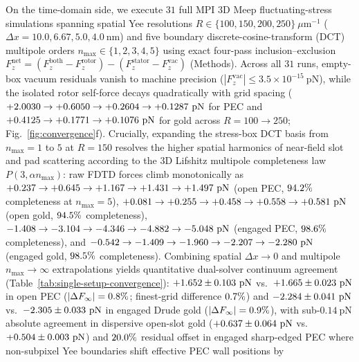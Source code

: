 \documentclass[pdflatex,sn-nature]{sn-jnl}
\begin{document}
On the time-domain side, we execute $31$ full MPI 3D Meep\cite{oskooi2010} fluctuating-stress simulations\cite{rodriguez2009pra} spanning spatial Yee resolutions $R \in \{100, 150, 200, 250\}\ \mu\mathrm{m}^{-1}$ ($\Delta x = 10.0, 6.67, 5.0, 4.0\ \mathrm{nm}$) and five boundary discrete-cosine-transform (DCT) multipole orders $n_{\max} \in \{1,2,3,4,5\}$ using exact four-pass inclusion--exclusion $F_z^{\mathrm{net}} = (F_z^{\mathrm{both}} - F_z^{\mathrm{rotor}}) - (F_z^{\mathrm{stator}} - F_z^{\mathrm{vac}})$ (Methods). Across all $31$ runs, empty-box vacuum residuals vanish to machine precision ($|F_z^{\mathrm{vac}}| \le 3.5 \times 10^{-15}\ \mathrm{pN}$), while the isolated rotor self-force decays quadratically with grid spacing ($+2.0030{} \to +0.6050{} \to +0.2604{} \to +0.1287{}\ \mathrm{pN}$ for PEC and $+0.4125{} \to +0.1771{} \to +0.1076{}\ \mathrm{pN}$ for gold across $R=100\to 250$; Fig.~\ref{fig:convergence}f). Crucially, expanding the stress-box DCT basis from $n_{\max}=1$ to $5$ at $R=150$ resolves the higher spatial harmonics of near-field slot and pad scattering according to the 3D Lifshitz multipole completeness law $P(3,\alpha n_{\max})$: raw FDTD forces climb monotonically as $+0.237{} \to +0.645{} \to +1.167{} \to +1.431{} \to +1.497{}\ \mathrm{pN}$ (open PEC, $94.2{}\%$ completeness at $n_{\max}=5$), $+0.081{} \to +0.255{} \to +0.458{} \to +0.558{} \to +0.581{}\ \mathrm{pN}$ (open gold, $94.5{}\%$ completeness), $-1.408{} \to -3.104{} \to -4.346{} \to -4.882{} \to -5.048{}\ \mathrm{pN}$ (engaged PEC, $98.6{}\%$ completeness), and $-0.542{} \to -1.409{} \to -1.960{} \to -2.207{} \to -2.280{}\ \mathrm{pN}$ (engaged gold, $98.5{}\%$ completeness). Combining spatial $\Delta x \to 0$ and multipole $n_{\max} \to \infty$ extrapolations yields quantitative dual-solver continuum agreement (Table~\ref{tab:single-setup-convergence}): $+1.652{} \pm 0.103{}\ \mathrm{pN}$ vs.\ $+1.665{} \pm 0.023{}\ \mathrm{pN}$ in open PEC ($|\Delta F_\infty| = 0.8{}\%$; finest-grid difference $0.7{}\%$) and $-2.284{} \pm 0.041{}\ \mathrm{pN}$ vs.\ $-2.305{} \pm 0.033{}\ \mathrm{pN}$ in engaged Drude gold ($|\Delta F_\infty| = 0.9{}\%$), with sub-$0.14\ \mathrm{pN}$ absolute agreement in dispersive open-slot gold ($+0.637{} \pm 0.064{}\ \mathrm{pN}$ vs.\ $+0.504{} \pm 0.003{}\ \mathrm{pN}$) and $20.0{}\%$ residual offset in engaged sharp-edged PEC where non-subpixel Yee boundaries shift effective PEC wall positions by 
\end{document}
